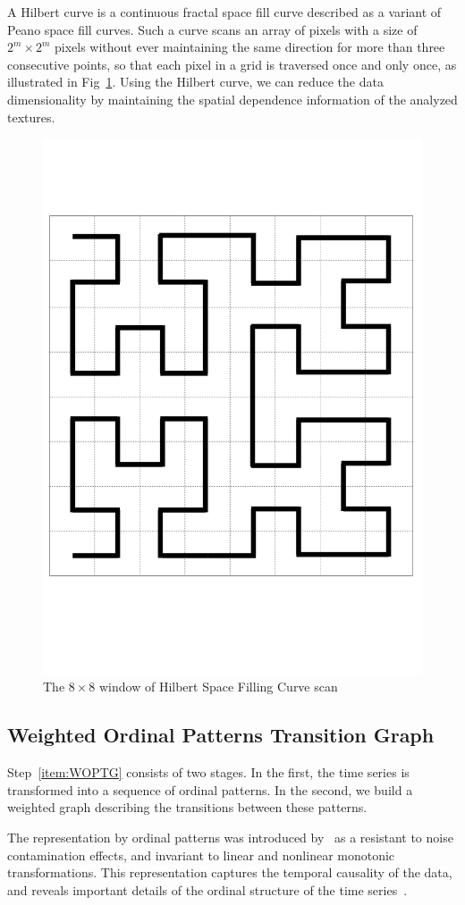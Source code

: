 \documentclass{isprs}
\begin{document}
	A Hilbert curve is a continuous fractal space fill curve described as a variant of Peano space fill curves.
	Such a curve scans an array of pixels with a size of $2^m \times 2^m$ pixels without ever maintaining the same direction for more than three consecutive points, so that each pixel in a grid is traversed once and only once, as illustrated in Fig~\ref{fig:Hilbert}.
	Using the Hilbert curve, we can reduce the data dimensionality by maintaining the spatial dependence information of the analyzed textures.
	
	\begin{figure}[hbt]
		\centering
		\includegraphics[width=.3\linewidth]{Figures/hilbert.png}
		\vspace{-0.5cm}
		\caption{The $8 \times 8$ window of Hilbert Space Filling Curve scan}
		\label{fig:Hilbert}
	\end{figure}
	
	\subsection{Weighted Ordinal Patterns Transition Graph}\label{WATG}
	
	Step~\ref{item:WOPTG} consists of two stages.
	In the first, the time series is transformed into a sequence of ordinal patterns.
	In the second, we build a weighted graph describing the transitions between these patterns.
	
	The representation by ordinal patterns was introduced by~\cite{Bandt2002Permutation} as a resistant to noise contamination effects, and invariant to linear and nonlinear monotonic transformations.
	This representation captures the temporal causality of the data, and reveals important details of the ordinal structure of the time series~\cite{Larrondo2006Random}.
	
\end{document}
